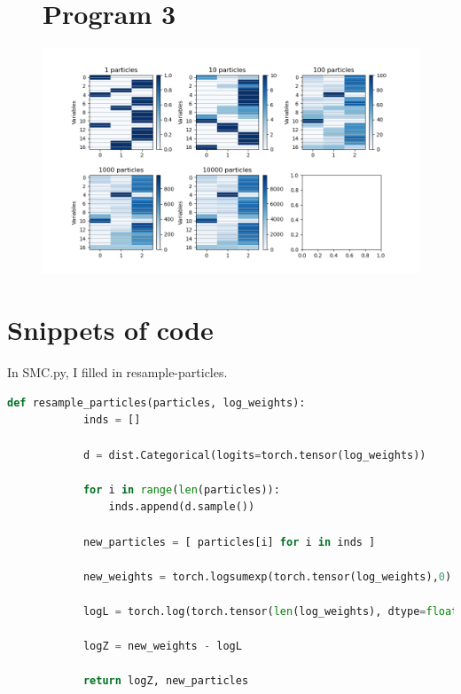 \documentclass[12pt]{article}%
\theoremstyle{definition}
\begin{document}
	
	\begin{figure}[h]
	\section{Program 3}
	\includegraphics[scale=0.75]{program3_hist}
	\end{figure}
	
		

	
	\newpage

	\begin{figure}[h]
	
	\end{figure}
	
	
	\newpage
	
	\section{Snippets of code}
	
	In SMC.py, I filled in resample-particles.
	
		\begin{lstlisting}[language=Python]
		def resample_particles(particles, log_weights):
		    inds = []
		
		    d = dist.Categorical(logits=torch.tensor(log_weights))
		    
		    for i in range(len(particles)):
		        inds.append(d.sample())
		
		    new_particles = [ particles[i] for i in inds ]
		
		    new_weights = torch.logsumexp(torch.tensor(log_weights),0)
		
		    logL = torch.log(torch.tensor(len(log_weights), dtype=float))
		
		    logZ = new_weights - logL
		
		    return logZ, new_particles
		\end{lstlisting}
		
\end{document}
